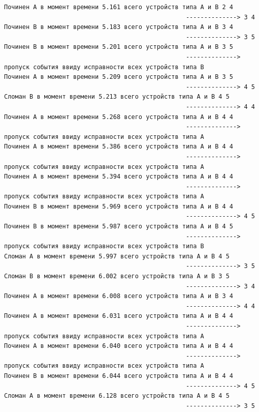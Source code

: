 \begin{verbatim}
Починен A в момент времени 5.161 всего устройств типа А и В 2 4
                                                  --------------> 3 4
Починен B в момент времени 5.183 всего устройств типа А и В 3 4
                                                  --------------> 3 5
Починен B в момент времени 5.201 всего устройств типа А и В 3 5
                                                  --------------> пропуск события ввиду исправности всех устройств типа В
Починен A в момент времени 5.209 всего устройств типа А и В 3 5
                                                  --------------> 4 5
Сломан B в момент времени 5.213 всего устройств типа А и В 4 5
                                                  --------------> 4 4
Починен A в момент времени 5.268 всего устройств типа А и В 4 4
                                                  --------------> пропуск события ввиду исправности всех устройств типа А
Починен A в момент времени 5.386 всего устройств типа А и В 4 4
                                                  --------------> пропуск события ввиду исправности всех устройств типа А
Починен A в момент времени 5.394 всего устройств типа А и В 4 4
                                                  --------------> пропуск события ввиду исправности всех устройств типа А
Починен B в момент времени 5.969 всего устройств типа А и В 4 4
                                                  --------------> 4 5
Починен B в момент времени 5.987 всего устройств типа А и В 4 5
                                                  --------------> пропуск события ввиду исправности всех устройств типа В
Сломан A в момент времени 5.997 всего устройств типа А и В 4 5
                                                  --------------> 3 5
Сломан B в момент времени 6.002 всего устройств типа А и В 3 5
                                                  --------------> 3 4
Починен A в момент времени 6.008 всего устройств типа А и В 3 4
                                                  --------------> 4 4
Починен A в момент времени 6.031 всего устройств типа А и В 4 4
                                                  --------------> пропуск события ввиду исправности всех устройств типа А
Починен A в момент времени 6.040 всего устройств типа А и В 4 4
                                                  --------------> пропуск события ввиду исправности всех устройств типа А
Починен B в момент времени 6.044 всего устройств типа А и В 4 4
                                                  --------------> 4 5
Сломан A в момент времени 6.128 всего устройств типа А и В 4 5
                                                  --------------> 3 5

\end{verbatim}
